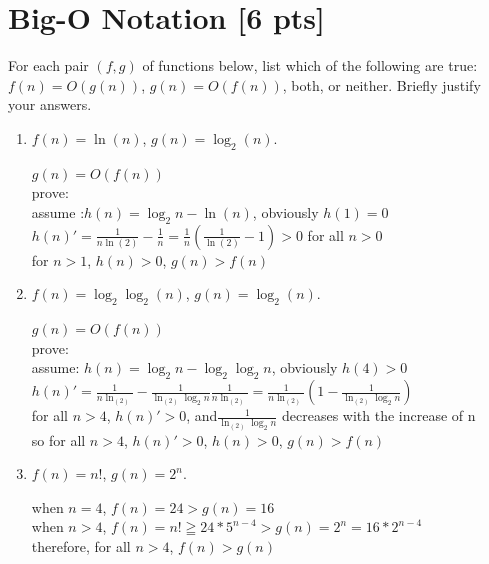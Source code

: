 \documentclass[a4paper]{article}
\theoremstyle{definition}
\newenvironment{soln}{
	\leavevmode\color{blue}\ignorespaces
}{}
\begin{document}
	
	\section{Big-O Notation [6 pts]}
	For each pair $(f, g)$ of functions below, list which of the following
	are true: $f(n) = O(g(n))$, $g(n) = O(f(n))$, both, or
	neither. Briefly justify your answers.
	\begin{enumerate}
		\item 	$f(n) = \ln(n)$, $g(n) = \log_{2}(n)$.\\
		\begin{soln}
			$g(n) = O(f(n))$\\
			prove: \\
			assume :$h(n) = \log_{2}{n} - \ln(n)$, obviously $h(1) = 0$ \\
			$h(n)' = \frac{1}{n\ln(2)} - \frac{1}{n} = \frac{1}{n}(\frac{1}{\ln(2)}-1) > 0$ for all $n > 0$ \\
			for $n > 1$, $h(n) > 0$, $g(n) > f(n)$ 
		\end{soln}
		
		\item 	$f(n) =  \log_{2}\log_{2}(n)$, $g(n) = \log_{2}(n)$.\\
		\begin{soln}
			$g(n) = O(f(n))$\\
			prove: \\
			assume: $h(n) = \log_{2}{n} - \log_{2}{\log_{2}{n}}$, obviously $h(4) > 0$ \\
			$h(n)' = \frac{1}{n\ln_(2)} - \frac{1}{\ln_(2)\log_{2}{n}}\frac{1}{n\ln_(2)} = \frac{1}{n\ln_(2)}(1 - \frac{1}{\ln_(2)\log_{2}{n}})$ \\
			for all $n > 4$, $h(n)' > 0$, and$\frac{1}{\ln_(2)\log_{2}{n}}$ decreases with the increase of n\\
			so for all $n > 4$, $h(n)' > 0$, $h(n) > 0$, $g(n) > f(n)$

		\end{soln}
		
		\item 	$f(n) = n!$, $g(n) = 2^n$.\\
		\begin{soln}
			when $n = 4$, $f(n) = 24 > g(n) = 16$ \\
			when $n > 4$, $f(n) = n! \geqq 24 * 5^{n-4} > g(n) = 2^{n} = 16 * 2^{n-4}$ \\
			therefore, for all $n > 4$, $f(n) > g(n)$
			
		\end{soln}
	\end{enumerate}
	
\end{document}
